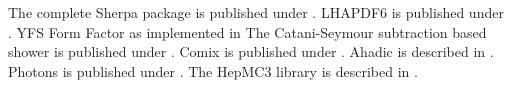 \documentclass{article}
\begin{document}
The complete Sherpa package is published under \cite{Sherpa:2024mfk}.
LHAPDF6 is published under \cite{Buckley:2014ana}.
YFS Form Factor as implemented in \cite{Jadach:1999vf}
The Catani-Seymour subtraction based shower is published under \cite{Schumann:2007mg}.
Comix is published under \cite{Gleisberg:2008fv}.
Ahadic is described in \cite{Chahal:2022rid}.
Photons is published under \cite{Schonherr:2008av}.
The HepMC3 library is described in \cite{Buckley:2019xhk}.
\end{document}

